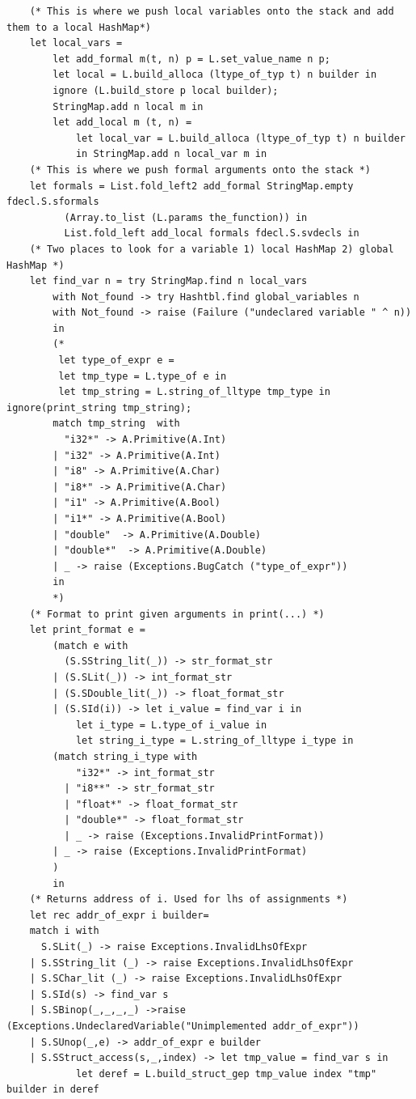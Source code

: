 \documentclass{article}
\begin{document}
\begin{lstlisting}
	(* This is where we push local variables onto the stack and add them to a local HashMap*)
	let local_vars = 
		let add_formal m(t, n) p = L.set_value_name n p;
		let local = L.build_alloca (ltype_of_typ t) n builder in
		ignore (L.build_store p local builder);
		StringMap.add n local m in
		let add_local m (t, n) =
        	let local_var = L.build_alloca (ltype_of_typ t) n builder
        	in StringMap.add n local_var m in
	(* This is where we push formal arguments onto the stack *)
	let formals = List.fold_left2 add_formal StringMap.empty fdecl.S.sformals
          (Array.to_list (L.params the_function)) in
          List.fold_left add_local formals fdecl.S.svdecls in
	(* Two places to look for a variable 1) local HashMap 2) global HashMap *)
	let find_var n = try StringMap.find n local_vars
		with Not_found -> try Hashtbl.find global_variables n
		with Not_found -> raise (Failure ("undeclared variable " ^ n))
		in
		(*
		 let type_of_expr e =
		 let tmp_type = L.type_of e in
		 let tmp_string = L.string_of_lltype tmp_type in ignore(print_string tmp_string);
		match tmp_string  with 
	  	  "i32*" -> A.Primitive(A.Int)
	  	| "i32" -> A.Primitive(A.Int)
	  	| "i8" -> A.Primitive(A.Char)
	  	| "i8*" -> A.Primitive(A.Char)
	  	| "i1" -> A.Primitive(A.Bool)
		| "i1*" -> A.Primitive(A.Bool)
		| "double"  -> A.Primitive(A.Double) 
		| "double*"  -> A.Primitive(A.Double) 
		| _ -> raise (Exceptions.BugCatch ("type_of_expr"))
		in 
		*)
	(* Format to print given arguments in print(...) *)
	let print_format e =
		(match e with 
		  (S.SString_lit(_)) -> str_format_str
		| (S.SLit(_)) -> int_format_str
		| (S.SDouble_lit(_)) -> float_format_str
		| (S.SId(i)) -> let i_value = find_var i in 
			let i_type = L.type_of i_value in 
			let string_i_type = L.string_of_lltype i_type in 
		(match string_i_type with 
		    "i32*" -> int_format_str 
		  | "i8**" -> str_format_str
		  | "float*" -> float_format_str
		  | "double*" -> float_format_str
		  | _ -> raise (Exceptions.InvalidPrintFormat))		
		| _ -> raise (Exceptions.InvalidPrintFormat) 
		)
		in
	(* Returns address of i. Used for lhs of assignments *)
	let rec addr_of_expr i builder= 
	match i with
	  S.SLit(_) -> raise Exceptions.InvalidLhsOfExpr
	| S.SString_lit (_) -> raise Exceptions.InvalidLhsOfExpr
	| S.SChar_lit (_) -> raise Exceptions.InvalidLhsOfExpr
 	| S.SId(s) -> find_var s
	| S.SBinop(_,_,_,_) ->raise (Exceptions.UndeclaredVariable("Unimplemented addr_of_expr"))
 	| S.SUnop(_,e) -> addr_of_expr e builder
	| S.SStruct_access(s,_,index) -> let tmp_value = find_var s in 
			let deref = L.build_struct_gep tmp_value index "tmp" builder in deref

\end{lstlisting}
\end{document}
